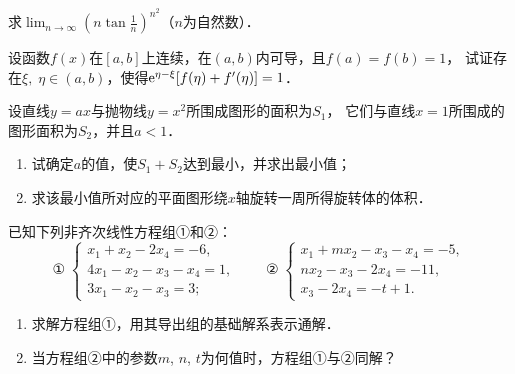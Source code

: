 \documentclass[plain,noanswer,medmath]{../../template/jnuexam}
\begin{document}



\begin{problem}
求$\lim_{n \to \infty} \left(n\tan \frac{1}{n} \right)^{n^2}$（$n$为自然数）．
\end{problem}












\begin{problem}
设函数$f(x)$在$\left[a,b \right]$上连续，在$\left(a,b \right)$内可导，且$f(a) = f(b) = 1$，
试证存在$\xi ,\;\eta \in(a,b)$，使得$\mathrm{e}^{\eta - \xi}[f(\eta) + f'(\eta)] = 1$．
\end{problem}



\begin{problem}
设直线$y = ax$与抛物线$y = x^2$所围成图形的面积为$S_1$，
它们与直线$x = 1$所围成的图形面积为$S_2$，并且$a < 1$．
\begin{enumerate}
\item 试确定$a$的值，使$S_1 + S_2$达到最小，并求出最小值；
\item 求该最小值所对应的平面图形绕$x$轴旋转一周所得旋转体的体积．
\end{enumerate}
\end{problem}






\begin{problem}
已知下列非齐次线性方程组①和②：
$$\text{①}\;\begin{cases}
  x_1 + x_2 - 2x_4 = - 6, \\
  4x_1 - x_2 - x_3 - x_4 = 1, \\
  3x_1 - x_2 - x_3 = 3;
\end{cases}\qquad\text{②}\;\begin{cases}
  x_1 + mx_2 - x_3 - x_4 = - 5, \\
  nx_2 - x_3 - 2x_4 = - 11, \\
  x_3 - 2x_4 = - t + 1.
\end{cases}$$
\begin{enumerate}
\item 求解方程组①，用其导出组的基础解系表示通解．
\item 当方程组②中的参数$m$, $n$, $t$为何值时，方程组①与②同解？
\end{enumerate}
\end{problem}
\end{document}
